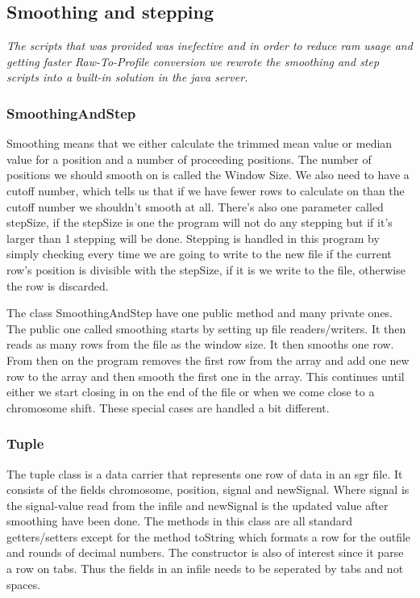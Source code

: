 \subsection{Smoothing and stepping}
\emph{The scripts that was provided was inefective and in order to reduce ram usage and getting faster Raw-To-Profile conversion we rewrote the smoothing and step scripts into a built-in solution in the java server.}

\subsubsection{SmoothingAndStep}
Smoothing means that we either calculate the trimmed mean value or median value for a position and a number of proceeding positions. The number of positions we should smooth on is called the Window Size. We also need to have a cutoff number, which tells us that if we have fewer rows to calculate on than the cutoff number we shouldn't smooth at all. There's also one parameter called stepSize, if the stepSize is one the program will not do any stepping but if it's larger than 1 stepping will be done. Stepping is handled in this program by simply checking every time we are going to write to the new file if the current row's position is divisible with the stepSize, if it is we write to the file, otherwise the row is discarded.

The class SmoothingAndStep have one public method and many private ones. The public one called smoothing starts by setting up file readers/writers. It then reads as many rows from the file as the window size. It then smooths one row. From then on the program removes the first row from the array and add one new row to the array and then smooth the first one in the array. This continues until either we start closing in on the end of the file or when we come close to a chromosome shift. These special cases are handled a bit different.




\subsubsection{Tuple}
The tuple class is a data carrier that represents one row of data in an sgr file. It consists of the fields chromosome, position, signal and newSignal. Where signal is the signal-value read from the infile and newSignal is the updated value after smoothing have been done.
The methods in this class are all standard getters/setters except for the method toString which formats a row for the outfile and rounds of decimal numbers. The constructor is also of interest since it parse a row on tabs. Thus the fields in an infile needs to be seperated by tabs and not spaces.


